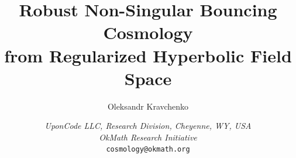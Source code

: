 \documentclass[11pt,a4paper]{article}
\title{Robust Non-Singular Bouncing Cosmology\\from Regularized Hyperbolic Field Space}
\author{Oleksandr Kravchenko}
\date{%
    \small \textit{UponCode LLC, Research Division, Cheyenne, WY, USA}\\%
    \textit{OkMath Research Initiative}\\[2ex]%
    \footnotesize \texttt{cosmology@okmath.org}%
}
\begin{document}
\providecommand{\nsAnalytical}{0.9667}
\providecommand{\rAnalytical}{0.0033}
\providecommand{\AsAnalytical}{2.23e-09}
\providecommand{\constraintMedian}{1.2}
\providecommand{\constraintPninetyfive}{5.3}
\providecommand{\HCmedian}{10^{-4}}
\providecommand{\nsNumerical}{0.9923}
\providecommand{\fitMaxResidual}{0.050}
\providecommand{\nsCMBnumerical}{0.9683}
\providecommand{\nsCMBexactFit}{0.9678}
\providecommand{\nsCMBleading}{0.9667}
\providecommand{\nsCMBdelta}{5.47e-04}
\providecommand{\nsCMBdeltaLeading}{1.67e-03}
\providecommand{\nCMBmodes}{11}
\providecommand{\AsRatioMean}{1.035}
\providecommand{\AsAgreementPct}{3.5}
\providecommand{\nAlphaPoints}{11}
\providecommand{\nsAlphaMean}{0.9672}
\providecommand{\phiCMBmeasured}{5.4290}
\providecommand{\NactualAtCMB}{60.000}
\providecommand{\NtotalInflationAlphaScan}{86.44}
\providecommand{\nAlphaPointsNT}{11}
\providecommand{\nsAlphaMeanNT}{0.96699}
\providecommand{\nsAlphaStdNT}{2.40e-06}
\providecommand{\nsAlphaSpreadNT}{8.25e-06}
\providecommand{\KchiMaxNT}{11.6}
\providecommand{\gCMBminNT}{0.748}
\providecommand{\gCMBmaxNT}{1.000}
\providecommand{\nsFitKgeqFive}{0.99228}
\providecommand{\nsFitKgeqFiveModes}{11}
\providecommand{\nsFitKgeqFiveRes}{0.050}
\providecommand{\nsFitKgeqTen}{0.99741}
\providecommand{\nsFitKgeqTenModes}{9}
\providecommand{\nsFitKgeqTenRes}{0.008}
\providecommand{\nsFitKgeqFifteen}{0.99963}
\providecommand{\nsFitKgeqFifteenModes}{8}
\providecommand{\nsFitKgeqFifteenRes}{0.002}
\providecommand{\nsFitKgeqTwenty}{1.00045}
\providecommand{\nsFitKgeqTwentyModes}{7}
\providecommand{\nsFitKgeqTwentyRes}{0.001}
\providecommand{\bumpAmpLnT}{1.97}
\providecommand{\bumpKpeak}{0.72}
\providecommand{\bumpSigmaLnK}{0.45}
\providecommand{\bumpNtotal}{2630}
\providecommand{\NhiddenEfolds}{2570}
\providecommand{\RConservationDelta}{4.43e-03}
\providecommand{\RConservationNearly}{1.0}
\providecommand{\RConservationNlate}{5.0}
\providecommand{\cSSqMaxDev}{8e-16}
\providecommand{\cTSqMaxDev}{0e+00}
\providecommand{\cSEffDeviation}{0.00e+00}
\providecommand{\turnRateMax}{0.00e+00}
\providecommand{\cSProbeCount}{203}
\providecommand{\NpostBounce}{398.0}
\providecommand{\fNLCMBdeltaN}{+0.0133}
\providecommand{\fNLCMBconsistency}{+0.0134}
\providecommand{\fNLCMBconsistencyLeading}{+0.0139}
\providecommand{\fNLCMBdelta}{1.54e-04}
\providecommand{\fNLCMBdeltaLeading}{6.38e-04}
\providecommand{\fNLBounce}{+3.16e-04}
\providecommand{\logTenkCMBoverkH}{1116}
\providecommand{\logTenfNLBounceAtCMB}{-2232}
\providecommand{\attractorRelErrMedian}{1.4e-04}
\providecommand{\attractorRelErrMax}{1.4e-04}
\providecommand{\attractorPhiRangeLo}{9.836}
\providecommand{\attractorPhiRangeHi}{9.957}
\end{document}
